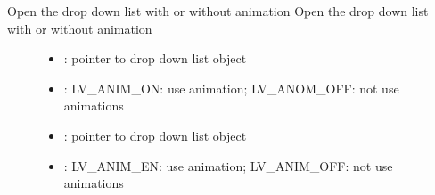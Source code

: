\documentclass[letterpaper,10pt,english]{sphinxmanual}
\begin{document}

\begin{fulllineitems}
\label{\detokenize{object-types/ddlist:_CPPv414lv_ddlist_openP8lv_obj_t16lv_anim_enable_t}}%
\pysigstartmultiline
{}\label{\detokenize{object-types/ddlist:lv__ddlist_8h_1ad5ab0176e026e3cb7f92f7f51cb2c5a1}}%
\pysigstopmultiline
Open the drop down list with or without animation 
Open the drop down list with or without animation 
\begin{description}
\item[{}] \leavevmode\begin{itemize}
\item {} 
: pointer to drop down list object 

\item {} 
: LV\_ANIM\_ON: use animation; LV\_ANOM\_OFF: not use animations

\end{itemize}

\item[{}] \leavevmode\begin{itemize}
\item {} 
: pointer to drop down list object 

\item {} 
: LV\_ANIM\_EN: use animation; LV\_ANIM\_OFF: not use animations 

\end{itemize}

\end{description}


\end{fulllineitems}

\end{document}
